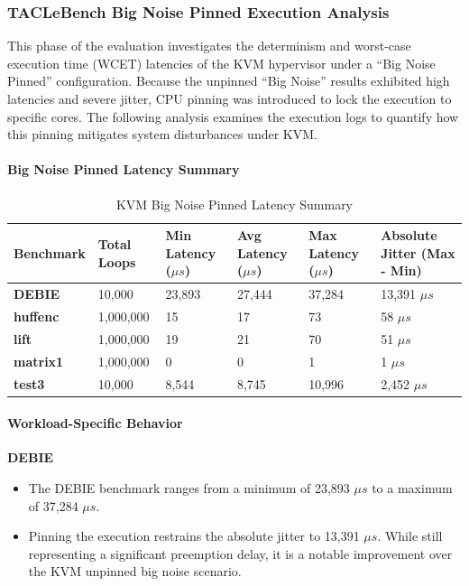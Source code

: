 \subsubsection{TACLeBench Big Noise Pinned Execution
Analysis}\label{taclebench-big-noise-pinned-execution-analysis}

This phase of the evaluation investigates the determinism and worst-case
execution time (WCET) latencies of the KVM hypervisor under a ``Big
Noise Pinned'' configuration. Because the unpinned ``Big Noise'' results
exhibited high latencies and severe jitter, CPU pinning was introduced
to lock the execution to specific cores. The following analysis examines
the execution logs to quantify how this pinning mitigates system
disturbances under KVM.

\paragraph{Big Noise Pinned Latency
Summary}\label{big-noise-pinned-latency-summary}

\begin{table}
\centering
\caption{KVM Big Noise Pinned Latency Summary}
\label{tab:kvm:big-noise-pinned}
\begin{tabularx}{\linewidth}{@{}YYYYYY@{}}
\toprule
Benchmark & Total Loops & Min Latency ($\mu s$) & Avg Latency ($\mu s$) & Max Latency ($\mu s$) & Absolute Jitter (Max - Min)\tabularnewline
\midrule
\textbf{DEBIE} & 10,000 & 23,893 & 27,444 & 37,284 & 13,391 $\mu s$\tabularnewline
\textbf{huffenc} & 1,000,000 & 15 & 17 & 73 & 58 $\mu s$\tabularnewline
\textbf{lift} & 1,000,000 & 19 & 21 & 70 & 51 $\mu s$\tabularnewline
\textbf{matrix1} & 1,000,000 & 0 & 0 & 1 & 1 $\mu s$\tabularnewline
\textbf{test3} & 10,000 & 8,544 & 8,745 & 10,996 & 2,452 $\mu s$\tabularnewline
\bottomrule
\end{tabularx}
\end{table}

\paragraph{Workload-Specific
Behavior}\label{workload-specific-behavior-3}

\textbf{DEBIE}

\begin{itemize}
\item
  The DEBIE benchmark ranges from a minimum of 23,893 $\mu s$ to a maximum of
  37,284 $\mu s$.
\item
  Pinning the execution restrains the absolute jitter to 13,391 $\mu s$.
  While still representing a significant preemption delay, it is a
  notable improvement over the KVM unpinned big noise scenario.
\end{itemize}

